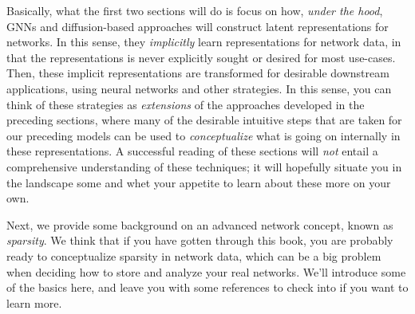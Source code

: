 Basically, what the first two sections will do is focus on how, \textit{under the hood}, GNNs and diffusion-based approaches will construct latent representations for networks. In this sense, they \textit{implicitly} learn representations for network data, in that the representations is never explicitly sought or desired for most use-cases. Then, these implicit representations are transformed for desirable downstream applications, using neural networks and other strategies. In this sense, you can think of these strategies as \textit{extensions} of the approaches developed in the preceding sections, where many of the desirable intuitive steps that are taken for our preceding models can be used to \textit{conceptualize} what is going on internally in these representations. A successful reading of these sections will \textit{not} entail a comprehensive understanding of these techniques; it will hopefully situate you in the landscape some and whet your appetite to learn about these more on your own.

Next, we provide some background on an advanced network concept, known as \textit{sparsity}. We think that if you have gotten through this book, you are probably ready to conceptualize sparsity in network data, which can be a big problem when deciding how to store and analyze your real networks. We'll introduce some of the basics here, and leave you with some references to check into if you want to learn more.







